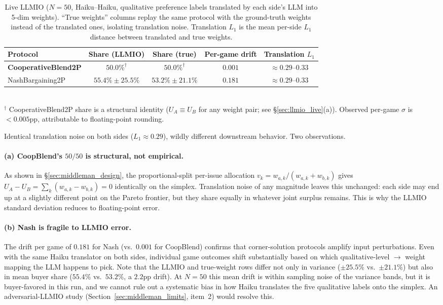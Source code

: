 \documentclass[11pt,a4paper]{article}
\begin{document}
\begin{table}[h]
\centering
\caption{Live LLMIO ($N = 50$, Haiku--Haiku, qualitative preference labels translated by each side's LLM into 5-dim weights). ``True weights'' columns replay the same protocol with the ground-truth weights instead of the translated ones, isolating translation noise. Translation $L_1$ is the mean per-side $L_1$ distance between translated and true weights.}
\label{tab:middleman_llmio}
\small
\begin{tabular}{lcccc}
\toprule
Protocol & Share (LLMIO) & Share (true) & Per-game drift & Translation $L_1$ \\
\midrule
\textbf{CooperativeBlend2P} & $\mathbf{50.0\%}^{\dagger}$ & $50.0\%^{\dagger}$ & $\mathbf{0.001}$ & $\approx 0.29$--$0.33$ \\
NashBargaining2P            & $55.4\% \pm 25.5\%$ & $53.2\% \pm 21.1\%$ & $0.181$ & $\approx 0.29$--$0.33$ \\
\bottomrule
\end{tabular}\\[0.4em]
\footnotesize $^{\dagger}$ CooperativeBlend2P share is a structural identity ($U_A \!\equiv\! U_B$ for any weight pair; see \S\ref{sec:llmio_live}(a)). Observed per-game $\sigma$ is $<\!0.005$pp, attributable to floating-point rounding.
\end{table}

Identical translation noise on both sides ($L_1 \approx 0.29$), wildly different downstream behavior. Two observations.

\paragraph{(a) CoopBlend's $50/50$ is structural, not empirical.} As shown in \S\ref{sec:middleman_design}, the proportional-split per-issue allocation $v_k = w_{a,k}/(w_{a,k}+w_{b,k})$ gives $U_A - U_B = \sum_k (w_{a,k} - w_{b,k}) = 0$ identically on the simplex. Translation noise of any magnitude leaves this unchanged: each side may end up at a slightly different point on the Pareto frontier, but they share equally in whatever joint surplus remains. This is why the LLMIO standard deviation reduces to floating-point error.

\paragraph{(b) Nash is fragile to LLMIO error.} The drift per game of $0.181$ for Nash (vs.\ $0.001$ for CoopBlend) confirms that corner-solution protocols amplify input perturbations. Even with the same Haiku translator on both sides, individual game outcomes shift substantially based on which qualitative-level $\to$ weight mapping the LLM happens to pick. Note that the LLMIO and true-weight rows differ not only in variance ($\pm 25.5\%$ vs.\ $\pm 21.1\%$) but also in mean buyer share ($55.4\%$ vs.\ $53.2\%$, a $2.2$pp drift). At $N\!=\!50$ this mean drift is within sampling noise of the variance bands, but it is buyer-favored in this run, and we cannot rule out a systematic bias in how Haiku translates the five qualitative labels onto the simplex. An adversarial-LLMIO study (Section~\ref{sec:middleman_limits}, item~2) would resolve this.
\end{document}
